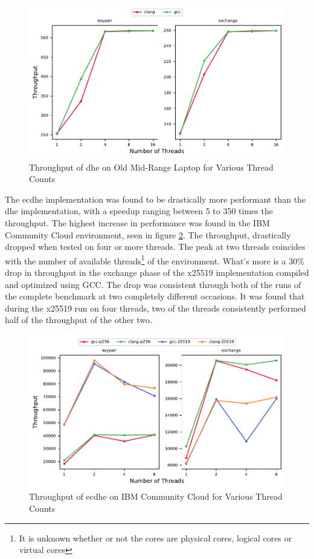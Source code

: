 \begin{figure}
    \centering
    \includegraphics[scale=0.75]{chapters/results/throughput/Old Mid-Range Laptop_dh.pdf}
    \caption{Throughput of \gls{dhe} on Old Mid-Range Laptop for Various Thread Counts}
    \label{figure:results:throughput:dh-old-mid-range-laptop}
\end{figure}

The \gls{ecdhe} implementation was found to be drastically more performant than the \gls{dhe} implementation, with a speedup ranging between 5 to 350 times the throughput. The highest increase in performance was found in the IBM Community Cloud environment, seen in figure \ref{figure:results:throughput:ecdh-ibm-community-cloud}. The throughput, drastically dropped when tested on four or more threads. The peak at two threads coincides with the number of available threads\footnote{It is unknown whether or not the cores are physical cores, logical cores or virtual cores} of the environment. What's more is a 30\% drop in throughput in the exchange phase of the \gls{x25519} implementation compiled and optimized using GCC. The drop was consistent through both of the runs of the complete benchmark at two completely different occasions. It was found that during the \gls{x25519} run on four threads, two of the threads consistently performed half of the throughput of the other two.

\begin{figure}
    \centering
    \includegraphics[scale=0.75]{chapters/results/throughput/IBM Community Cloud_ecdh.pdf}
    \caption{Throughput of \gls{ecdhe} on IBM Community Cloud for Various Thread Counts}
    \label{figure:results:throughput:ecdh-ibm-community-cloud}
\end{figure}

